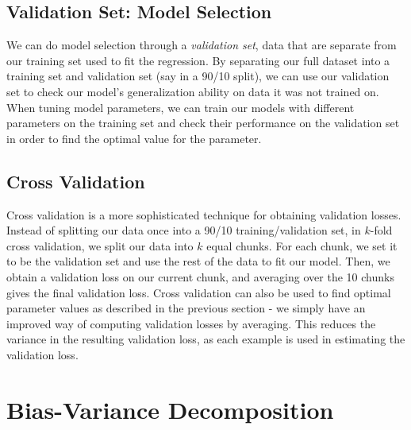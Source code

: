 \documentclass[12pt,letterpaper]{article}
\begin{document}
\vspace{0.5cm}


\subsection{Validation Set: Model Selection}

We can do model selection through a \emph{validation set}, data that are separate from our training set used to fit the regression. By separating our full dataset into a training set and validation set (say in a 90/10 split), we can use our validation set to check our model's generalization ability on data it was not trained on. When tuning model parameters, we can train our models with different parameters on the training set and check their performance on the validation set in order to find the optimal value for the parameter. 

\subsection{Cross Validation}

Cross validation is a more sophisticated technique for obtaining validation losses. Instead of splitting our data once into a 90/10 training/validation set, in $k$-fold cross validation, we split our data into $k$ equal chunks. For each chunk, we set it to be the validation set and use the rest of the data to fit our model. Then, we obtain a validation loss on our current chunk, and averaging over the 10 chunks gives the final validation loss. Cross validation can also be used to find optimal parameter values as described in the previous section - we simply have an improved way of computing validation losses by averaging. This reduces the variance in the resulting validation loss, as each example is used in estimating the validation loss.


\section{Bias-Variance Decomposition}
\end{document}
